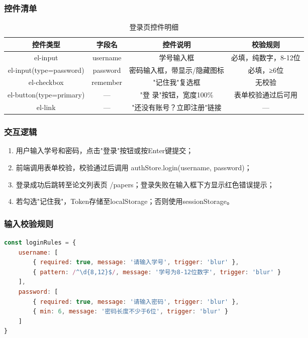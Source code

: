 \documentclass{../softeng}
\begin{document}
\subsubsection{控件清单}
\begin{table}[htbp]
    \centering
    \caption{登录页控件明细}
    \begin{tabular}{|c|c|c|c|}
        \hline
        \textbf{控件类型} & \textbf{字段名} & \textbf{控件说明} & \textbf{校验规则} \\
        \hline
        el-input & username & 学号输入框 & 必填，纯数字，8-12位 \\
        \hline
        el-input(type=password) & password & 密码输入框，带显示/隐藏图标 & 必填，≥6位 \\
        \hline
        el-checkbox & remember & "记住我"复选框 & 无校验 \\
        \hline
        el-button(type=primary) & — & "登 录"按钮，宽度100\% & 表单校验通过后可用 \\
        \hline
        el-link & — & "还没有账号？立即注册"链接 & — \\
        \hline
    \end{tabular}
\end{table}

\subsubsection{交互逻辑}
\begin{enumerate}
    \item 用户输入学号和密码，点击"登录"按钮或按Enter键提交；
    \item 前端调用表单校验，校验通过后调用 authStore.login(username, password)；
    \item 登录成功后跳转至论文列表页 /papers；登录失败在输入框下方显示红色错误提示；
    \item 若勾选"记住我"，Token存储至localStorage；否则使用sessionStorage。
\end{enumerate}

\subsubsection{输入校验规则}
\begin{lstlisting}[language=JavaScript]
const loginRules = {
    username: [
        { required: true, message: '请输入学号', trigger: 'blur' },
        { pattern: /^\d{8,12}$/, message: '学号为8-12位数字', trigger: 'blur' }
    ],
    password: [
        { required: true, message: '请输入密码', trigger: 'blur' },
        { min: 6, message: '密码长度不少于6位', trigger: 'blur' }
    ]
}
\end{lstlisting}
\end{document}

